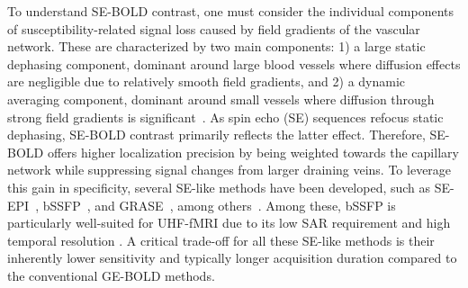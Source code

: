 To understand \gls{SE}-\gls{BOLD} contrast, one must consider the individual components of susceptibility-related signal loss caused by field gradients of the vascular network. These are characterized by two main components: 1) a large static dephasing component, dominant around large blood vessels where diffusion effects are negligible due to relatively smooth field gradients, and 2) a dynamic averaging component, dominant around small vessels where diffusion through strong field gradients is significant~\cite{weisskoffMicroscopicSusceptibilityVariation1994,boxermanMrContrastDue1995}. As spin echo (\gls{SE}) sequences refocus static dephasing, \gls{SE}-\gls{BOLD} contrast primarily reflects the latter effect. Therefore, \gls{SE}-\gls{BOLD} offers higher localization precision by being weighted towards the capillary network while suppressing signal changes from larger draining veins. To leverage this gain in specificity, several \gls{SE}-like methods have been developed, such as \gls{SE}-\gls{EPI}~\cite{yacoubSpinechoFMRIHumans2003,buddeFunctionalMRIHuman2014}, \gls{bSSFP}~\cite{bowenHighFieldBalancedSSFP2005,schefflerHighresolutionFunctionalImaging2015}, and \gls{GRASE}~\cite{kemperSubmillimeterT2Weighted2015}, among others~\cite{norrisSpinechoFMRIPoor2012}. Among these, \gls{bSSFP} is particularly well-suited for \gls{UHF}-\gls{fMRI} due to its low \gls{SAR} requirement and high temporal resolution \cite{bowenHighFieldBalancedSSFP2006,schefflerHighresolutionMappingNeuronal2016,ehsesMultilineBalancedSSFP2018}. A critical trade-off for all these \gls{SE}-like methods is their inherently lower sensitivity and typically longer acquisition duration compared to the conventional \gls{GE}-\gls{BOLD} methods.


